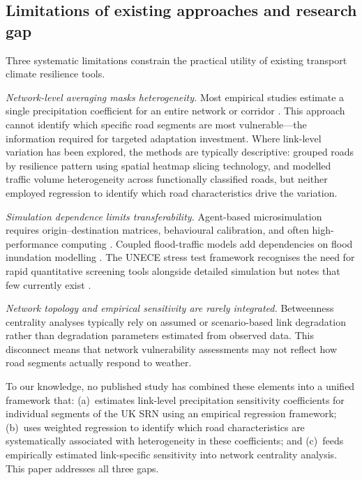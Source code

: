 \documentclass[review]{elsarticle}
\begin{document}
\subsection{Limitations of existing approaches and research gap}
\label{sec:lit:gap}

Three systematic limitations constrain the practical utility of existing transport climate resilience tools.

\textit{Network-level averaging masks heterogeneity.} Most empirical studies estimate a single precipitation coefficient for an entire network or corridor \citep{hranac2006empirical,koetse2009impact,bi2022weather}. This approach cannot identify which specific road segments are most vulnerable---the information required for targeted adaptation investment. Where link-level variation has been explored, the methods are typically descriptive: \citet{gao2024resilience} grouped roads by resilience pattern using spatial heatmap slicing technology, and \citet{pulugurtha2021aadt} modelled traffic volume heterogeneity across functionally classified roads, but neither employed regression to identify which road characteristics drive the variation.

\textit{Simulation dependence limits transferability.} Agent-based microsimulation requires origin--destination matrices, behavioural calibration, and often high-performance computing \citep{huang2022overview}. Coupled flood-traffic models add dependencies on flood inundation modelling \citep{pregnolato2017depth,pregnolato2016impact,he2026flood}. The UNECE stress test framework recognises the need for rapid quantitative screening tools alongside detailed simulation but notes that few currently exist \citep{unece2024stress}.

\textit{Network topology and empirical sensitivity are rarely integrated.} Betweenness centrality analyses typically rely on assumed or scenario-based link degradation \citep{wassmer2024resilience,stamos2023centrality} rather than degradation parameters estimated from observed data. This disconnect means that network vulnerability assessments may not reflect how road segments actually respond to weather.

To our knowledge, no published study has combined these elements into a unified framework that: (a)~estimates link-level precipitation sensitivity coefficients for individual segments of the UK SRN using an empirical regression framework; (b)~uses weighted regression to identify which road characteristics are systematically associated with heterogeneity in these coefficients; and (c)~feeds empirically estimated link-specific sensitivity into network centrality analysis. This paper addresses all three gaps.
\end{document}
